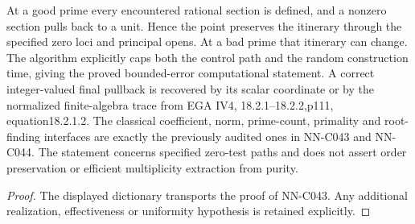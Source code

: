 \begin{geometricstatement}[NN-C043]
At a good prime every encountered rational section is defined,
and a nonzero section pulls back to a unit. Hence the point preserves
the itinerary through the specified zero loci and principal opens.
At a bad prime that itinerary can change. The algorithm explicitly
caps both the control path and the random construction time, giving
the proved bounded-error computational statement. A correct
integer-valued final pullback is recovered by its scalar coordinate
or by the normalized finite-algebra trace from EGA IV4,
18.2.1--18.2.2,p111, equation18.2.1.2. The classical coefficient,
norm, prime-count, primality and root-finding interfaces are exactly
the previously audited ones in NN-C043 and NN-C044. The statement
concerns specified zero-test paths and does not assert order
preservation or efficient multiplicity extraction from purity.
\end{geometricstatement}
\begin{proof} The displayed dictionary transports the proof of NN-C043. Any additional realization, effectiveness or uniformity hypothesis is retained explicitly.\end{proof}


